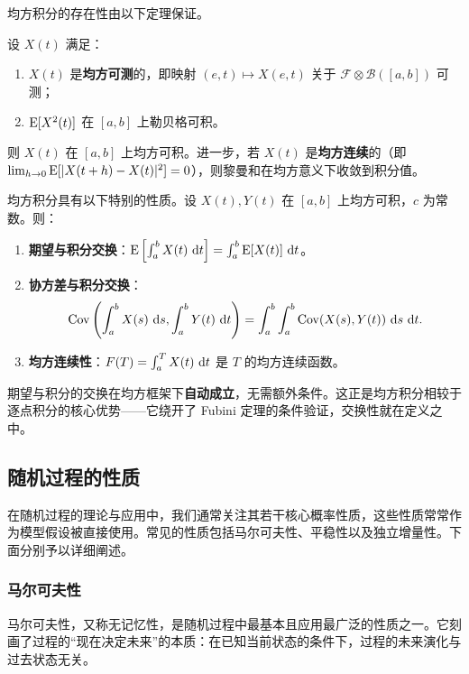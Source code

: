 均方积分的存在性由以下定理保证。

\begin{theorem}[均方可积的充分条件]
  设 $X(t)$ 满足：
  \begin{enumerate}
    \item $X(t)$ 是\textbf{均方可测}的，即映射 $(e, t) \mapsto X(e, t)$ 关于 $\mathcal{F}\otimes\mathcal{B}([a,b])$ 可测；
    \item $\operatorname{E}[X^2(t)]$ 在 $[a,b]$ 上勒贝格可积。
  \end{enumerate}
  则 $X(t)$ 在 $[a,b]$ 上均方可积。进一步，若 $X(t)$ 是\textbf{均方连续}的（即 $\lim_{h\to0} \operatorname{E}[|X(t+h)-X(t)|^2]=0$），则黎曼和在均方意义下收敛到积分值。
\end{theorem}

均方积分具有以下特别的性质。设 $X(t), Y(t)$ 在 $[a,b]$ 上均方可积，$c$ 为常数。则：
\begin{enumerate}
\item \textbf{期望与积分交换}：$\operatorname{E}\left[\int_a^b X(t)\,\mathop{}\!\mathrm{d} t\right] = \int_a^b \operatorname{E}[X(t)]\,\mathop{}\!\mathrm{d} t$。
\item \textbf{协方差与积分交换}：
\[
\operatorname{Cov}\left(\int_a^b X(s)\,\mathop{}\!\mathrm{d} s, \int_a^b Y(t)\,\mathop{}\!\mathrm{d} t\right) = \int_a^b\int_a^b \operatorname{Cov}(X(s), Y(t))\,\mathop{}\!\mathrm{d} s\,\mathop{}\!\mathrm{d} t.
\]
\item \textbf{均方连续性}：$F(T) = \int_a^T X(t)\,\mathop{}\!\mathrm{d} t$ 是 $T$ 的均方连续函数。
\end{enumerate}

\begin{attention}
期望与积分的交换在均方框架下\textbf{自动成立}，无需额外条件。这正是均方积分相较于逐点积分的核心优势——它绕开了 Fubini 定理的条件验证，交换性就在定义之中。
\end{attention}
    
\subsection{随机过程的性质}

在随机过程的理论与应用中，我们通常关注其若干核心概率性质，这些性质常常作为模型假设被直接使用。常见的性质包括马尔可夫性、平稳性以及独立增量性。下面分别予以详细阐述。

\subsubsection{马尔可夫性}

马尔可夫性，又称无记忆性，是随机过程中最基本且应用最广泛的性质之一。它刻画了过程的“现在决定未来”的本质：在已知当前状态的条件下，过程的未来演化与过去状态无关。

